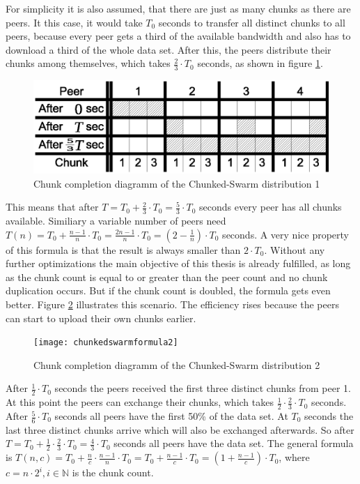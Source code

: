 For simplicity it is also assumed, that there are just as many chunks as there are peers. It this case, it would take $T_0$ seconds to transfer all distinct chunks to all peers, because every peer gets a third of the available bandwidth and also has to download a third of the whole data set. After this, the peers distribute their chunks among themselves, which takes $\frac{2}{3} \cdot T_0$ seconds, as shown in figure \ref{fig:chunkedswarmformula1}.

\begin{figure}[H]
\centering
\includegraphics[width=12cm]{chunkedswarmformula1}
\caption{Chunk completion diagramm of the Chunked-Swarm distribution 1}
\label{fig:chunkedswarmformula1}
\end{figure}

This means that after $T = T_0 + \frac{2}{3} \cdot T_0 = \frac{5}{3} \cdot T_0$ seconds every peer has all chunks available. Similiary a variable number of peers need $T(n) = T_0 + \frac{n - 1}{n} \cdot T_0 = \frac{2n - 1}{n} \cdot T_0 = (2 - \frac{1}{n}) \cdot T_0$ seconds. A very nice property of this formula is that the result is always smaller than $2 \cdot T_0$. Without any further optimizations the main objective of this thesis is already fulfilled, as long as the chunk count is equal to or greater than the peer count and no chunk duplication occurs. But if the chunk count is doubled, the formula gets even better. Figure \ref{fig:chunkedswarmformula2} illustrates this scenario. The efficiency rises because the peers can start to upload their own chunks earlier.

\begin{figure}[H]
\centering
\texttt{[image: chunkedswarmformula2]}
\caption{Chunk completion diagramm of the Chunked-Swarm distribution 2}
\label{fig:chunkedswarmformula2}
\end{figure}

After $\frac{1}{2} \cdot T_0$ seconds the peers received the first three distinct chunks from peer 1. At this point the peers can exchange their chunks, which takes $\frac{1}{2} \cdot \frac{2}{3} \cdot T_0$ seconds. After $\frac{5}{6} \cdot T_0$ seconds all peers have the first 50\% of the data set. At $T_0$ seconds the last three distinct chunks arrive which will also be exchanged afterwards. So after $T = T_0 + \frac{1}{2} \cdot \frac{2}{3} \cdot T_0 = \frac{4}{3} \cdot T_0$ seconds all peers have the data set. The general formula is $T(n, c) = T_0 + \frac{n}{c} \cdot \frac{n-1}{n} \cdot T_0 =  T_0 + \frac{n-1}{c} \cdot T_0 = (1 + \frac{n-1}{c}) \cdot T_0$, where $c = n \cdot 2^i, i \in \mathbb{N}$ is the chunk count.

